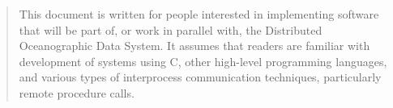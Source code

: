 %
%
%

\small

\begin{quotation}
  This document is written for people interested in implementing software
  that will be part of, or work in parallel with, the Distributed
  Oceanographic Data System. It assumes that readers are familiar with
  development of systems using C, other high-level programming languages, and
  various types of interprocess communication techniques, particularly remote
  procedure calls.
\end{quotation}

\normalsize
